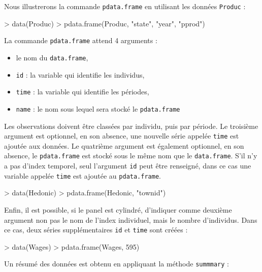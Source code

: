 \documentclass[a4paper]{article}
\begin{document}
Nous illustrerons la commande
\texttt{pdata.frame} en utilisant les données \texttt{Produc} :


\begin{Schunk}
\begin{Sinput}
> data(Produc)
> pdata.frame(Produc, "state", "year", "pprod")
\end{Sinput}
\end{Schunk}

La commande \texttt{pdata.frame} attend 4 arguments :

\begin{itemize}
\item le nom du \texttt{data.frame},
\item \texttt{id} : la variable qui identifie les individus,
\item \texttt{time} : la variable qui identifie les périodes,
\item \texttt{name} : le nom sous lequel sera stocké le \texttt{pdata.frame}
\end{itemize}

Les observations doivent être classées par individu, puis par période. Le
troisième argument est optionnel, en son absence, une nouvelle série
appelée \texttt{time} est ajoutée aux données. Le quatrième argument
est également optionnel, en son absence, le \texttt{pdata.frame} est
stocké sous le même nom que le \texttt{data.frame}.
S'il n'y a pas d'index temporel, seul l'argument \texttt{id} peut être
renseigné, dans ce cas une variable appelée \texttt{time} est ajoutée
au \texttt{pdata.frame}.


\begin{Schunk}
\begin{Sinput}
> data(Hedonic)
> pdata.frame(Hedonic, "townid")
\end{Sinput}
\end{Schunk}

Enfin, il est possible, si le panel est cylindré, d'indiquer comme
deuxième argument non pas le nom de l'index individuel, mais le nombre
d'individus. Dans ce cas, deux séries supplémentaires \texttt{id} et
\texttt{time} sont créées :

\begin{Schunk}
\begin{Sinput}
> data(Wages)
> pdata.frame(Wages, 595)
\end{Sinput}
\end{Schunk}

Un résumé des données est obtenu en appliquant la méthode
\texttt{summmary} :
\end{document}
